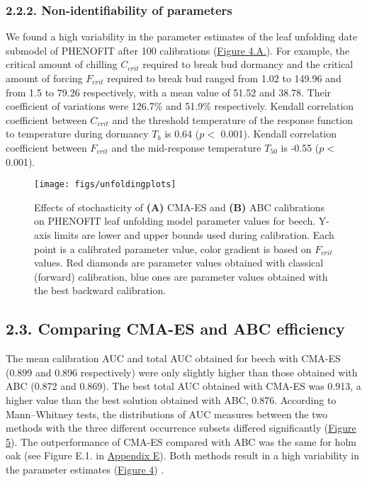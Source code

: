 \documentclass[11pt,]{article}
\begin{document}
\hypertarget{non-identifiability-of-parameters}{%
\subsubsection{2.2.2. Non-identifiability of
parameters}\label{non-identifiability-of-parameters}}

We found a high variability in the parameter estimates of the leaf
unfolding date submodel of PHENOFIT after 100 calibrations
(\hyperref[fig:unfoldingplots]{Figure 4.A.}). For example, the critical
amount of chilling \(C_{crit}\) required to break bud dormancy and the
critical amount of forcing \(F_{crit}\) required to break bud ranged
from 1.02 to 149.96 and from 1.5 to 79.26 respectively, with a mean
value of 51.52 and 38.78. Their coefficient of variations were 126.7\%
and 51.9\% respectively. Kendall correlation coefficient between
\(C_{crit}\) and the threshold temperature of the response function to
temperature during dormancy \(T_b\) is 0.64 (\(p <\) 0.001). Kendall
correlation coefficient between \(F_{crit}\) and the mid-response
temperature \(T_{50}\) is -0.55 (\(p <\) 0.001).

\begin{figure}[H]

{\centering \texttt{[image: figs/unfoldingplots]} 

}

\caption{Effects of stochasticity of \textbf{(A)} CMA-ES and \textbf{(B)} ABC calibrations on PHENOFIT leaf unfolding model parameter values for beech. Y-axis limits are lower and upper bounds used during calibration. Each point is a calibrated parameter value, color gradient is based on $F_{crit}$ values. Red diamonds are parameter values obtained with classical (forward) calibration, blue ones are parameter values obtained with the best backward calibration.}\label{fig:unfoldingplots}
\end{figure}

\hypertarget{comparing-cma-es-and-abc-efficiency}{%
\subsection{2.3. Comparing CMA-ES and ABC
efficiency}\label{comparing-cma-es-and-abc-efficiency}}

The mean calibration AUC and total AUC obtained for beech with CMA-ES
(0.899 and 0.896 respectively) were only slightly higher than those
obtained with ABC (0.872 and 0.869). The best total AUC obtained with
CMA-ES was 0.913, a higher value than the best solution obtained with
ABC, 0.876. According to Mann--Whitney tests, the distributions of AUC
measures between the two methods with the three different occurrence
subsets differed significantly
(\hyperref[fig:comparisonABCCMAES]{Figure 5}). The outperformance of
CMA-ES compared with ABC was the same for holm oak (see Figure E.1. in
\protect\hyperlink{appendixE}{Appendix E}). Both methods result in a
high variability in the parameter estimates
(\hyperref[fig:unfoldingplots]{Figure 4}) .
\end{document}
